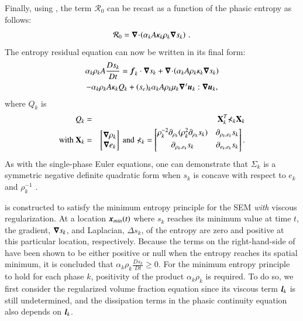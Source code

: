 Finally, using , the term $\mathcal{R}_0$ can be recast as a function of the phasic entropy as follows: 
%
\begin{equation}
\mathcal{R}_0 = \boldsymbol\nabla\! \cdot \! \left( \alpha_k A \kappa_k \rho_k \boldsymbol\nabla s_k \right) \,.
\end{equation}
%
The entropy residual equation can now be written in its final form:
%
\begin{multline}\label{eq:ent-res-7-eqn-diss-terms3}
\alpha_k \rho_k A \frac{Ds_k}{Dt} =  \boldsymbol f_k \cdot \boldsymbol\nabla s_k + \boldsymbol\nabla\! \cdot \! \left( \alpha_k A \rho_k \kappa_k  \boldsymbol\nabla s_k \right)  \\
- \alpha_k \rho_k A \kappa_k Q_k + (s_e)_k \alpha_k A \rho_k \mu_k \boldsymbol\nabla^s \boldsymbol u_k : \boldsymbol\nabla \boldsymbol u_k,
\end{multline}
%
where $Q_k$ is 
%
\begin{eqnarray}
Q_k &=& \mathbf{X}^T_k \mathbb{\Sigma}_k \mathbf{X}_k \nonumber \\
\text{with } \mathbf{X}_k &=& \begin{bmatrix}
\boldsymbol\nabla \rho_k \\
\boldsymbol\nabla e_k 
\end{bmatrix}
\text{ and } \mathbb{\Sigma}_k = \begin{bmatrix}
       \rho_k^{-2} \partial_{\rho_k} (\rho^2_k \partial_{\rho_k} s_k) & \partial_{\rho_k,e_k} s_k  \\[0.3em]
       \partial_{\rho_k,e_k} s_k & \partial_{e_k,e_k} s_k           \\[0.3em]
     \end{bmatrix}. \nonumber 
\end{eqnarray}
%
As with the single-phase Euler equations, one can demonstrate that $\mathbb{\Sigma}_k$ is a symmetric negative definite quadratic form 
when $s_k$ is concave with respect to $e_k$ and $\rho_k^{-1}$  \cite{jlg,Marco_paper_low_mach}.

 is constructed to satisfy the minimum entropy principle for the SEM \emph{with} viscous regularization. 
At a location $\boldsymbol x_{min}(t)$ where $s_k$ reaches its minimum value at time $t$, the gradient, $\boldsymbol\nabla s_k$, and Laplacian, $\Delta s_k$, 
of the entropy are zero and positive at this particular location, respectively. Because the terms on the right-hand-side of 
 have been shown to be either positive or null when 
the entropy reaches its spatial minimum, it is concluded that $\alpha_k \rho_k \frac{D s_k}{Dt} \geq 0$. For the minimum entropy principle to 
hold for each phase $k$, positivity of the product $\alpha_k \rho_k$ is required. To do so, we first consider the regularized volume fraction 
equation since its viscous term $\boldsymbol l_k$ is still undetermined, and the dissipation terms in the phasic continuity equation also 
depends on $\boldsymbol l_k$.

